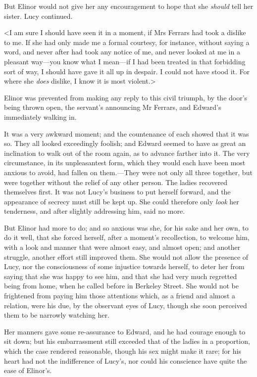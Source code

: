 But Elinor would not give her any encouragement to hope that she \textit{should} tell her sister. Lucy continued.

<I am sure I should have seen it in a moment, if Mrs Ferrars had took a dislike to me. If she had only made me a formal courtesy, for instance, without saying a word, and never after had took any notice of me, and never looked at me in a pleasant way—you know what I mean—if I had been treated in that forbidding sort of way, I should have gave it all up in despair. I could not have stood it. For where she \textit{does} dislike, I know it is most violent.>

Elinor was prevented from making any reply to this civil triumph, by the door's being thrown open, the servant's announcing Mr Ferrars, and Edward's immediately walking in.

It was a very awkward moment; and the countenance of each showed that it was so. They all looked exceedingly foolish; and Edward seemed to have as great an inclination to walk out of the room again, as to advance farther into it. The very circumstance, in its unpleasantest form, which they would each have been most anxious to avoid, had fallen on them.—They were not only all three together, but were together without the relief of any other person. The ladies recovered themselves first. It was not Lucy's business to put herself forward, and the appearance of secrecy must still be kept up. She could therefore only \textit{look} her tenderness, and after slightly addressing him, said no more.

But Elinor had more to do; and so anxious was she, for his sake and her own, to do it well, that she forced herself, after a moment's recollection, to welcome him, with a look and manner that were almost easy, and almost open; and another struggle, another effort still improved them. She would not allow the presence of Lucy, nor the consciousness of some injustice towards herself, to deter her from saying that she was happy to see him, and that she had very much regretted being from home, when he called before in Berkeley Street. She would not be frightened from paying him those attentions which, as a friend and almost a relation, were his due, by the observant eyes of Lucy, though she soon perceived them to be narrowly watching her.

Her manners gave some re-assurance to Edward, and he had courage enough to sit down; but his embarrassment still exceeded that of the ladies in a proportion, which the case rendered reasonable, though his sex might make it rare; for his heart had not the indifference of Lucy's, nor could his conscience have quite the ease of Elinor's.

